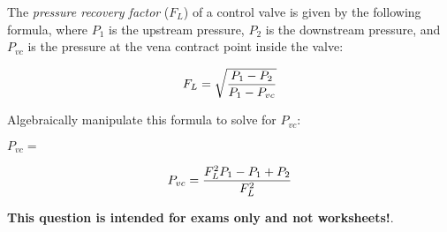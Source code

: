 

The {\it pressure recovery factor} ($F_L$) of a control valve is given by the following formula, where $P_1$ is the upstream pressure, $P_2$ is the downstream pressure, and $P_{vc}$ is the pressure at the vena contract point inside the valve:
 
$$F_L = \sqrt{P_1 - P_2 \over P_1 - P_{vc}}$$

Algebraically manipulate this formula to solve for $P_{vc}$:

\vskip 20pt

$P_{vc} = $







$$P_{vc} = {F_L^2 P_1 - P_1 + P_2 \over F_L^2}$$







{\bf This question is intended for exams only and not worksheets!}.



